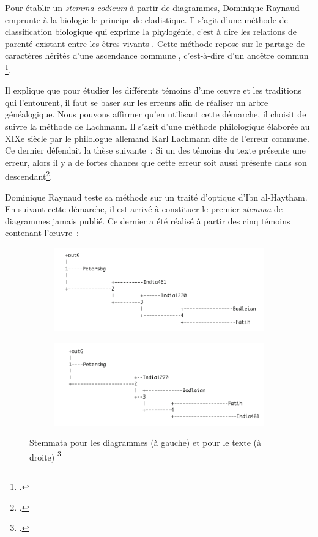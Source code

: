 Pour établir un \textit{stemma codicum} à partir de diagrammes, Dominique Raynaud emprunte à la biologie le principe de cladistique.
Il s'agit \og d'une méthode de classification biologique qui exprime la phylogénie, c'est à dire les relations de parenté existant entre les êtres vivants \fg.
Cette méthode \og repose sur le partage de caractères hérités d'une ascendance commune \fg, c'est-à-dire d'un \og ancêtre commun \fg \footcite{tassyCLADISTIQUE2012}.

Il explique que pour étudier les différents témoins d'une œuvre et les traditions qui l'entourent, il faut se baser sur les erreurs afin de réaliser un arbre généalogique.
Nous pouvons affirmer qu'en utilisant cette démarche, il choisit de suivre la méthode de Lachmann.
Il s'agit d'une méthode philologique élaborée au XIXe siècle par le philologue allemand Karl Lachmann dite de l'erreur commune.
Ce dernier défendait la thèse suivante~: Si un des témoins du texte présente une erreur, alors il y a de fortes chances que cette erreur soit aussi présente dans son descendant\footcite{pouliquenUsingLatticesReconstructing}.

Dominique Raynaud teste sa méthode sur un traité d'optique d'Ibn al-Haytham.
En suivant cette démarche, il est arrivé à constituer le premier \textit{stemma} de diagrammes jamais publié.
Ce dernier a été réalisé à partir des cinq témoins contenant l'œuvre~:

\begin{figure}[h]
	\centering
	\begin{subfigure}{0.48\linewidth}
		\centering
		\includegraphics[width=\linewidth]{images/diagram_stemma.png}
	\end{subfigure}
	\hfill
	\begin{subfigure}{0.48\linewidth}
		\centering
		\includegraphics[width=\linewidth]{images/text_stemma.png}
	\end{subfigure}
	\caption{Stemmata pour les diagrammes (à gauche) et pour le texte (à droite) \footcite{raynaudBuildingStemmaCodicum2014}}
	\label{fig:stemma}
\end{figure}

